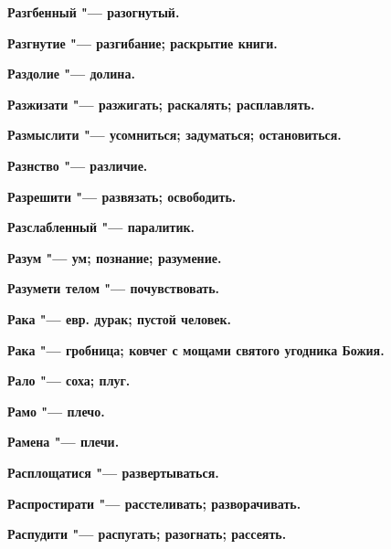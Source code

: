 \bfseries Разгбенный \normalfont{} "--- разогнутый. 




\bfseries Разгнутие \normalfont{} "--- разгибание; раскрытие книги. 




\bfseries Раздолие \normalfont{} "--- долина. 




\bfseries Разжизати \normalfont{} "--- разжигать; раскалять; расплавлять. 




\bfseries Размыслити \normalfont{} "--- усомниться; задуматься; остановиться. 




\bfseries Разнство \normalfont{} "--- различие. 




\bfseries Разрешити \normalfont{} "--- развязать; освободить. 




\bfseries Разслабленный \normalfont{} "--- паралитик. 




\bfseries Разум \normalfont{} "--- ум; познание; разумение. 




\bfseries Разумети телом \normalfont{} "--- почувствовать. 




\bfseries Рака \normalfont{} "--- евр. дурак; пустой человек. 




\bfseries Рака \normalfont{} "--- гробница; ковчег с мощами святого угодника Божия. 




\bfseries Рало \normalfont{} "--- соха; плуг. 




\bfseries Рамо \normalfont{} "--- плечо. 




\bfseries Рамена \normalfont{} "--- плечи. 




\bfseries Расплощатися \normalfont{} "--- развертываться. 




\bfseries Распростирати \normalfont{} "--- расстеливать; разворачивать. 




\bfseries Распудити \normalfont{} "--- распугать; разогнать; рассеять. 





